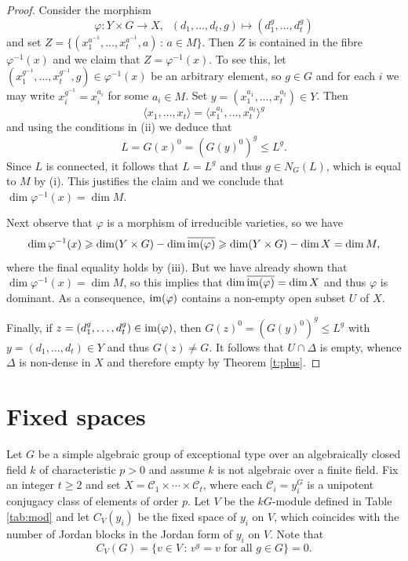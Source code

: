 \documentclass[twoside,a4paper,reqno,11pt]{amsart}
\newcommand{\<}{\langle}
\renewcommand{\>}{\rangle}
\newcommand{\la}{\langle}
\newcommand{\ra}{\rangle}
\newcommand{\leqs}{\leqslant}
\newcommand{\geqs}{\geqslant}
\renewcommand{\:}{\colon}
\theoremstyle{plain}
\theoremstyle{definition}
\begin{document}
\begin{proof}
Consider the morphism
\[
\varphi: Y \times G \to X, \;\; (d_1,\ldots,d_t,g) \mapsto (d_1^g, \ldots, d_t^g)
\]
and set $Z = \{ (x_1^{a^{-1}}, \ldots, x_t^{a^{-1}},a) \,:\, a \in M\}$. Then $Z$ is contained in the fibre $\varphi^{-1}(x)$ and we claim that $Z = \varphi^{-1}(x)$. To see this, let $(x_1^{g^{-1}}, \ldots, x_t^{g^{-1}},g) \in \varphi^{-1}(x)$ be an arbitrary element, so $g \in G$ and for each $i$ we may write $x_i^{g^{-1}} = x_i^{a_i}$ for some $a_i \in M$. Set $y = (x_1^{a_1}, \ldots, x_t^{a_t}) \in Y$. Then 
\[
\la x_1, \ldots, x_t \ra = \la x_1^{a_1}, \ldots, x_t^{a_t} \ra^g
\]
and using the conditions in (ii) we deduce that
\[
L = G(x)^0 = (G(y)^0)^g \leqs L^g.
\]
Since $L$ is connected, it follows that $L = L^g$ and thus $g \in N_G(L)$, which is equal to $M$ by (i). This justifies the claim and we conclude that $\dim \varphi^{-1}(x) = \dim M$. 

Next observe that $\varphi$ is a morphism of irreducible varieties, so we have
\[
\dim \varphi^{-1}(x) \geqs \dim (Y \times G) - \dim \overline{{\rm im}(\varphi)} \geqs \dim (Y \times G) - \dim X = \dim M,
\]
where the final equality holds by (iii). But we have already shown that $\dim \varphi^{-1}(x) = \dim M$, so this implies that $\dim \overline{{\rm im}(\varphi)} = \dim X$ and thus $\varphi$ is dominant. As a consequence, ${\rm im}(\varphi)$ contains a non-empty open subset $U$ of $X$. 

Finally, if $z = (d_1^g, \ldots, d_t^g) \in {\rm im}(\varphi)$, then 
$G(z)^0 = (G(y)^0)^g \leqs L^g$ with $y = (d_1, \ldots, d_t) \in Y$ and thus $G(z) \ne G$. It follows that $U \cap \Delta$ is empty, whence $\Delta$ is non-dense in $X$ and therefore empty by Theorem \ref{t:plus}.
\end{proof}

\section{Fixed spaces}\label{s:fixV}

Let $G$ be a simple algebraic group of exceptional type over an algebraically closed field $k$ of characteristic $p>0$ and assume $k$ is not algebraic over a finite field. Fix an integer $t \geqs 2$ and set $X = \mathcal{C}_1 \times \cdots \times \mathcal{C}_t$, where each $\mathcal{C}_i = y_i^G$ is a unipotent conjugacy class of elements of order $p$. Let $V$ be the $kG$-module defined in Table \ref{tab:mod} and let $C_V(y_i)$ be the fixed space of $y_i$ on $V$, which coincides with the number of Jordan blocks in the Jordan form of $y_i$ on $V$. Note that 
\[
C_V(G) = \{ v \in V \,:\, \mbox{$v^g = v$ for all $g \in G$} \} = 0.
\]
\end{document}
